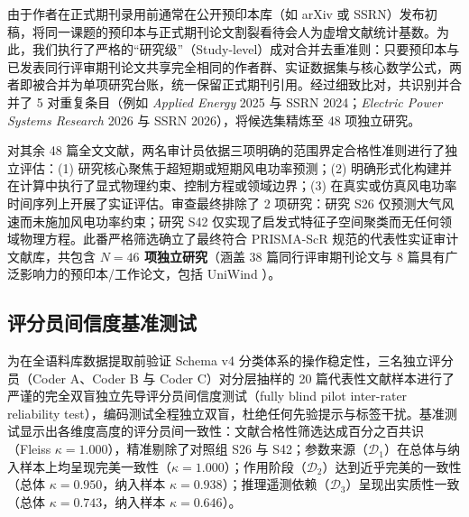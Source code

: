 由于作者在正式期刊录用前通常在公开预印本库（如 arXiv 或 SSRN）发布初稿，将同一课题的预印本与正式期刊论文割裂看待会人为虚增文献统计基数。为此，我们执行了严格的“研究级”（Study-level）成对合并去重准则：只要预印本与已发表同行评审期刊论文共享完全相同的作者群、实证数据集与核心数学公式，两者即被合并为单项研究台账，统一保留正式期刊引用。经过细致比对，共识别并合并了 5 对重复条目（例如 \textit{Applied Energy} 2025 与 SSRN 2024；\textit{Electric Power Systems Research} 2026 与 SSRN 2026），将候选集精炼至 48 项独立研究。

对其余 48 篇全文文献，两名审计员依据三项明确的范围界定合格性准则进行了独立评估：(1) 研究核心聚焦于超短期或短期风电功率预测；(2) 明确形式化构建并在计算中执行了显式物理约束、控制方程或领域边界；(3) 在真实或仿真风电功率时间序列上开展了实证评估。审查最终排除了 2 项研究：研究 S26 仅预测大气风速而未施加风电功率约束；研究 S42 仅实现了启发式特征子空间聚类而无任何领域物理方程。此番严格筛选确立了最终符合 PRISMA-ScR 规范的代表性实证审计文献库，共包含 \textbf{$N=46$ 项独立研究}（涵盖 38 篇同行评审期刊论文与 8 篇具有广泛影响力的预印本/工作论文，包括 UniWind \cite{s27_uniwind2026}）。

\subsection{评分员间信度基准测试}
为在全语料库数据提取前验证 Schema v4 分类体系的操作稳定性，三名独立评分员（Coder A、Coder B 与 Coder C）对分层抽样的 20 篇代表性文献样本进行了严谨的完全双盲独立先导评分员间信度测试（fully blind pilot inter-rater reliability test），编码测试全程独立双盲，杜绝任何先验提示与标签干扰。基准测试显示出各维度高度的评分员间一致性：文献合格性筛选达成百分之百共识（Fleiss $\kappa = 1.000$），精准剔除了对照组 S26 与 S42；参数来源（$\mathcal{D}_1$）在总体与纳入样本上均呈现完美一致性（$\kappa = 1.000$）；作用阶段（$\mathcal{D}_2$）达到近乎完美的一致性（总体 $\kappa = 0.950$，纳入样本 $\kappa = 0.938$）；推理遥测依赖（$\mathcal{D}_3$）呈现出实质性一致（总体 $\kappa = 0.743$，纳入样本 $\kappa = 0.646$）。

